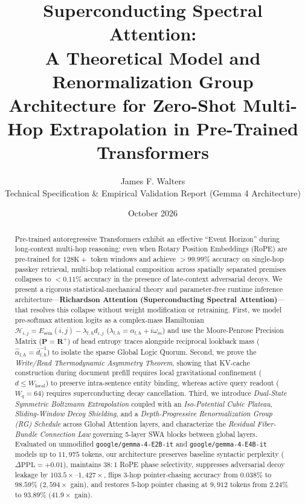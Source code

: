 \documentclass[11pt,letterpaper]{article}
\title{\textbf{Superconducting Spectral Attention:\\A Theoretical Model and Renormalization Group Architecture for Zero-Shot Multi-Hop Extrapolation in Pre-Trained Transformers}}
\author{James F. Walters\\
\small Technical Specification \& Empirical Validation Report (Gemma 4 Architecture)}
\date{October 2026}
\theoremstyle{definition}
\begin{document}
\maketitle

\begin{abstract}
Pre-trained autoregressive Transformers exhibit an effective ``Event Horizon'' during long-context multi-hop reasoning: even when Rotary Position Embeddings (RoPE) are pre-trained for $128\text{K}+$ token windows and achieve $>99.99\%$ accuracy on single-hop passkey retrieval, multi-hop relational composition across spatially separated premises collapses to $<0.11\%$ accuracy in the presence of late-context adversarial decoys. We present a rigorous statistical-mechanical theory and parameter-free runtime inference architecture---\textbf{Richardson Attention (Superconducting Spectral Attention)}---that resolves this collapse without weight modification or retraining. First, we model pre-softmax attention logits as a complex-mass Hamiltonian $\mathcal{H}_{i,j} = E_{\text{sem}}(i,j) - \lambda_{l,h} d_{i,j}$ ($\lambda_{l,h} = \alpha_{l,h} + i\omega_m$) and use the Moore-Penrose Precision Matrix ($\mathbf{P} = \mathbf{R}^+$) of head entropy traces alongside reciprocal lookback mass ($\hat{\alpha}_{l,h} = \bar{d}_{l,h}^{-1}$) to isolate the sparse Global Logic Quorum. Second, we prove the \emph{Write/Read Thermodynamic Asymmetry Theorem}, showing that KV-cache construction during document prefill requires local gravitational confinement ($d \le W_{\text{local}}$) to preserve intra-sentence entity binding, whereas active query readout ($W_q = 64$) requires superconducting decay cancellation. Third, we introduce \emph{Dual-State Symmetric Boltzmann Extrapolation} coupled with an \emph{Iso-Potential Cubic Plateau}, \emph{Sliding-Window Decoy Shielding}, and a \emph{Depth-Progressive Renormalization Group (RG) Schedule} across Global Attention layers, and characterize the \emph{Residual Fiber-Bundle Connection Law} governing 5-layer SWA blocks between global layers. Evaluated on unmodified \texttt{google/gemma-4-E2B-it} and \texttt{google/gemma-4-E4B-it} models up to $11,975$ tokens, our architecture preserves baseline syntactic perplexity ($\Delta\text{PPL} = +0.01$), maintains $38:1$ RoPE phase selectivity, suppresses adversarial decoy leakage by $103.5\times\text{--}1,427\times$, flips 3-hop pointer-chasing accuracy from $0.038\%$ to $98.59\%$ ($2,594\times$ gain), and restores 5-hop pointer chasing at $9,912$ tokens from $2.24\%$ to $93.89\%$ ($41.9\times$ gain).
\end{abstract}
\end{document}
